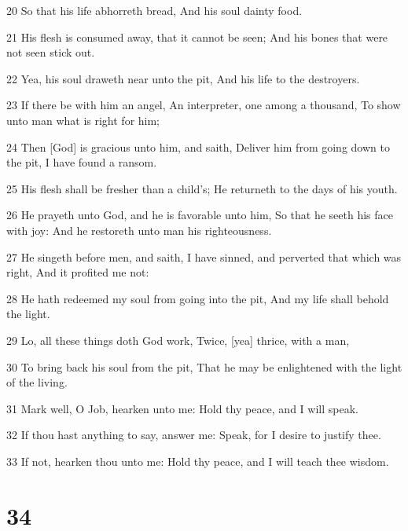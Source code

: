 \par 20 So that his life abhorreth bread, And his soul dainty food.
\par 21 His flesh is consumed away, that it cannot be seen; And his bones that were not seen stick out.
\par 22 Yea, his soul draweth near unto the pit, And his life to the destroyers.
\par 23 If there be with him an angel, An interpreter, one among a thousand, To show unto man what is right for him;
\par 24 Then [God] is gracious unto him, and saith, Deliver him from going down to the pit, I have found a ransom.
\par 25 His flesh shall be fresher than a child's; He returneth to the days of his youth.
\par 26 He prayeth unto God, and he is favorable unto him, So that he seeth his face with joy: And he restoreth unto man his righteousness.
\par 27 He singeth before men, and saith, I have sinned, and perverted that which was right, And it profited me not:
\par 28 He hath redeemed my soul from going into the pit, And my life shall behold the light.
\par 29 Lo, all these things doth God work, Twice, [yea] thrice, with a man,
\par 30 To bring back his soul from the pit, That he may be enlightened with the light of the living.
\par 31 Mark well, O Job, hearken unto me: Hold thy peace, and I will speak.
\par 32 If thou hast anything to say, answer me: Speak, for I desire to justify thee.
\par 33 If not, hearken thou unto me: Hold thy peace, and I will teach thee wisdom.

\chapter{34}

